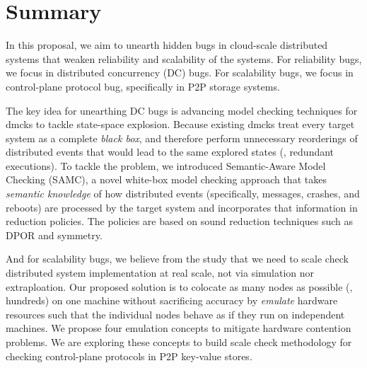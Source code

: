\chapter{Summary}
\label{chp-con}

In this proposal, we aim to unearth hidden bugs in cloud-scale distributed
systems that weaken reliability and scalability of the systems. For reliability
bugs, we focus in distributed concurrency (DC) bugs. For scalability bugs, we
focus in control-plane protocol bug, specifically in P2P storage systems.


The key idea for unearthing DC bugs is advancing model checking techniques for
dmcks to tackle state-space explosion. Because existing dmcks treat every target
system as a complete \textit{black box}, and therefore perform unnecessary
reorderings of distributed events that would lead to the same explored states
(\ie, redundant executions).  To tackle the problem, we introduced
Semantic-Aware Model Checking (SAMC), a novel white-box model checking approach
that takes \textit{semantic knowledge} of how distributed events (specifically,
messages, crashes, and reboots) are processed by the target system and
incorporates that information in reduction policies. The policies are based on
sound reduction techniques such as DPOR and symmetry.

And for scalability bugs, we believe from the study that we need to scale check
distributed system implementation at real scale, not via simulation nor
extraploation. Our proposed solution is to colocate as many nodes as possible
(\eg, hundreds) on one machine without sacrificing accuracy by {\em emulate}
hardware resources such that the individual nodes behave as if they run on
independent machines. We propose four emulation concepts to mitigate hardware
contention problems. We are exploring these concepts to build scale check
methodology for checking control-plane protocols in P2P key-value stores.


